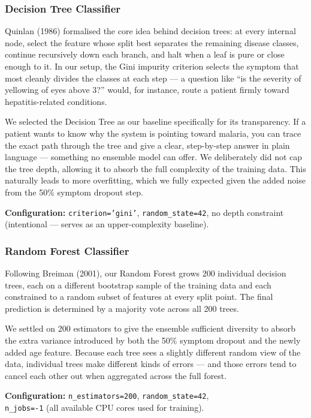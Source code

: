 \documentclass[12pt,a4paper]{article}
\begin{document}
\subsubsection{Decision Tree Classifier}
Quinlan (1986) formalised the core idea behind decision trees: at every internal node, select the feature whose split best separates the remaining disease classes, continue recursively down each branch, and halt when a leaf is pure or close enough to it. In our setup, the Gini impurity criterion selects the symptom that most cleanly divides the classes at each step --- a question like ``is the severity of yellowing of eyes above 3?'' would, for instance, route a patient firmly toward hepatitis-related conditions.

We selected the Decision Tree as our baseline specifically for its transparency. If a patient wants to know why the system is pointing toward malaria, you can trace the exact path through the tree and give a clear, step-by-step answer in plain language --- something no ensemble model can offer. We deliberately did not cap the tree depth, allowing it to absorb the full complexity of the training data. This naturally leads to more overfitting, which we fully expected given the added noise from the 50\% symptom dropout step.

\textbf{Configuration:} \texttt{criterion='gini'}, \texttt{random\_state=42}, no depth constraint (intentional --- serves as an upper-complexity baseline).

\subsubsection{Random Forest Classifier}
Following Breiman (2001), our Random Forest grows 200 individual decision trees, each on a different bootstrap sample of the training data and each constrained to a random subset of features at every split point. The final prediction is determined by a majority vote across all 200 trees.

We settled on 200 estimators to give the ensemble sufficient diversity to absorb the extra variance introduced by both the 50\% symptom dropout and the newly added age feature. Because each tree sees a slightly different random view of the data, individual trees make different kinds of errors --- and those errors tend to cancel each other out when aggregated across the full forest.

\textbf{Configuration:} \texttt{n\_estimators=200}, \texttt{random\_state=42},\\
\hspace*{2.6cm}\texttt{n\_jobs=-1} (all available CPU cores used for training).
\end{document}
